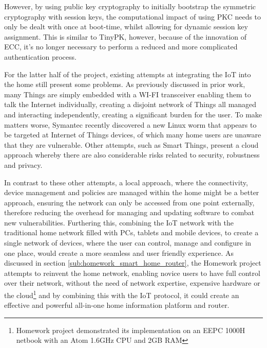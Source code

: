 \documentclass{mprop}
\begin{document}

However, by using public key cryptography to initially bootstrap the symmetric cryptography with session keys, the computational impact of using PKC needs to only be dealt with once at boot-time, whilst allowing for dynamic session key assignment. This is similar to TinyPK, however, because of the innovation of ECC, it's no longer necessary to perform a reduced and more complicated authentication process\cite{TinyPK}.

For the latter half of the project, existing attempts at integrating the IoT into the home still present some problems. As previously discussed in prior work\cite{KNoT}, many Things are simply embedded with a WI-FI transceiver enabling them to talk the Internet individually, creating a disjoint network of Things all managed and interacting independently, creating a significant burden for the user. To make matters worse, Symantec recently discovered a new Linux worm\cite{IoTWorm} that appears to be targeted at Internet of Things devices, of which many home users are unaware that they are vulnerable. Other attempts, such as Smart Things, present a cloud approach whereby there are also considerable risks related to security, robustness and privacy. 

In contrast to these other attempts, a local approach, where the connectivity, device management and policies are managed within the home might be a better approach, ensuring the network can only be accessed from one point externally, therefore reducing the overhead for managing and updating software to combat new vulnerabilities. Furthering this, combining the IoT network with the traditional home network filled with PCs, tablets and mobile devices, to create a single network of devices, where the user can control, manage and configure in one place, would create a more seamless and user friendly experience. As discussed in section \ref{sub:homework_smart_home_router}, the Homework project attempts to reinvent the home network, enabling novice users to have full control over their network, without the need of network expertise, expensive hardware or the cloud\footnote{Homework project demonstrated its implementation on an EEPC 1000H netbook with an Atom 1.6GHz CPU and 2GB RAM} and by combining this with the IoT protocol, it could create an effective and powerful all-in-one home information platform and router. 
\end{document}
